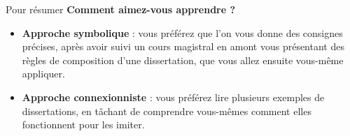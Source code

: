 \begin{frame}{Pour résumer}
    \textbf{Comment aimez-vous apprendre ?}\\
    \begin{itemize}
        \item \textbf{Approche symbolique} : vous préférez que l'on vous donne des consignes précises, après avoir suivi un cours magistral en amont vous présentant des règles de composition d'une dissertation, que vous allez ensuite vous-même appliquer.
        \item \textbf{Approche connexionniste} : vous préférez lire plusieurs exemples de dissertations, en tâchant de comprendre vous-mêmes comment elles fonctionnent pour les imiter.
    \end{itemize}

\end{frame}